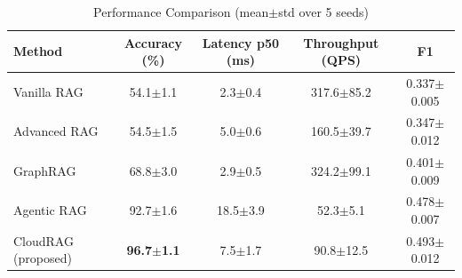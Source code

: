 \begin{table}[!t]
\caption{Performance Comparison (mean$\pm$std over 5 seeds)}
\label{tab:performance}
\centering
\footnotesize
\setlength{\tabcolsep}{3pt}
\begin{tabular}{lcccc}
\toprule
Method & Accuracy (\%) & Latency p50 (ms) & Throughput (QPS) & F1 \\
\midrule
Vanilla RAG & 54.1$\pm$1.1 & 2.3$\pm$0.4 & 317.6$\pm$85.2 & 0.337$\pm$0.005 \\
Advanced RAG & 54.5$\pm$1.5 & 5.0$\pm$0.6 & 160.5$\pm$39.7 & 0.347$\pm$0.012 \\
GraphRAG & 68.8$\pm$3.0 & 2.9$\pm$0.5 & 324.2$\pm$99.1 & 0.401$\pm$0.009 \\
Agentic RAG & 92.7$\pm$1.6 & 18.5$\pm$3.9 & 52.3$\pm$5.1 & 0.478$\pm$0.007 \\
CloudRAG (proposed) & \textbf{96.7$\pm$1.1} & 7.5$\pm$1.7 & 90.8$\pm$12.5 & 0.493$\pm$0.012 \\
\bottomrule
\end{tabular}
\end{table}

